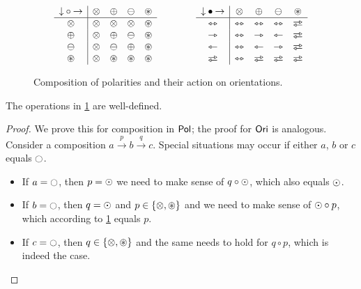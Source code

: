 \documentclass[a4paper]{memoir}
\begin{document}
\begin{figure}[htb]
	\[
		\begin{array}{c | c c c c}
			{\downarrow} \circ {\rightarrow} &
			          \mixpol & \pospol & \negpol & \isopol
			        \\ \hline
			\mixpol & \mixpol & \mixpol & \mixpol & \isopol
			        \\
			\pospol & \mixpol & \pospol & \negpol & \isopol
			        \\
			\negpol & \mixpol & \negpol & \pospol & \isopol
			        \\
			\isopol & \mixpol & \isopol & \isopol & \isopol
			        \\
		\end{array}
		\qquad \qquad
		\begin{array}{c | c c c c}
			{\downarrow} \oriof {\rightarrow} &
			          \mixpol & \pospol & \negpol & \isopol
			        \\ \hline
			\equijetsym & \equijetsym & \equijetsym & \equijetsym & \infrajetsym
			        \\
			\jetsym & \equijetsym & \jetsym & \tejsym & \infrajetsym
			        \\
			\tejsym & \equijetsym & \tejsym & \jetsym & \infrajetsym
			        \\
			\infrajetsym & \equijetsym & \infrajetsym & \infrajetsym & \infrajetsym
			        \\
		\end{array}
	\]
	\caption{Composition of polarities and their action on orientations.}
	\label{fig:polarity-orientation}
\end{figure}
\begin{proposition}
	The operations in \cref{fig:polarity-orientation} are well-defined.
\end{proposition}
\begin{proof}
	We prove this for composition in ${\mathsf{Pol}}$; the proof for ${\mathsf{Ori}}$ is analogous.
	Consider a composition $a \xrightarrow{p} b \xrightarrow{q} c$.
	Special situations may occur if either $a$, $b$ or $c$ equals $\npolar$.
	\begin{itemize}
		\item If $a = \npolar$, then $p = {\odot}$ we need to make sense of $q \circ {\odot}$, which also equals ${\odot}$.
		\item If $b = \npolar$, then $q = {\odot}$ and $p \in \mathopen{}\left\{ {\otimes}, {\oast} \right\}\mathclose{}$ and we need to make sense of ${\odot} \circ p$, which according to \cref{fig:polarity-orientation} equals $p$.
		\item If $c = \npolar$, then $q \in \mathopen{}\left\{ {\otimes}, {\oast} \right\}\mathclose{}$ and the same needs to hold for $q \circ p$, which is indeed the case. \qedhere
	\end{itemize}
\end{proof}
\end{document}
